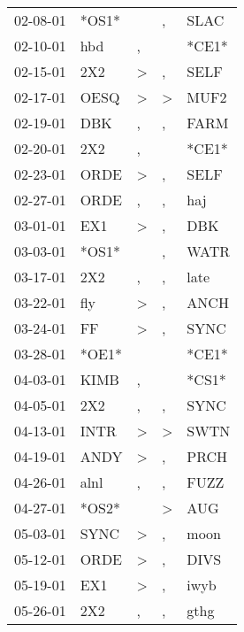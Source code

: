 \begin{supertabular}{lllll}
 02-08-01 &  *OS1* &                  &                , &   SLAC \\
 02-10-01 &    hbd &                , &                  &  *CE1* \\
 02-15-01 &    2X2 &     \textgreater &                , &   SELF \\
 02-17-01 &   OESQ &     \textgreater &     \textgreater &   MUF2 \\
 02-19-01 &    DBK &                , &                , &   FARM \\
 02-20-01 &    2X2 &                , &                  &  *CE1* \\
 02-23-01 &   ORDE &     \textgreater &                , &   SELF \\
 02-27-01 &   ORDE &                , &                , &    haj \\
 03-01-01 &    EX1 &     \textgreater &                , &    DBK \\
 03-03-01 &  *OS1* &                  &                , &   WATR \\
 03-17-01 &    2X2 &                , &                , &   late \\
 03-22-01 &    fly &     \textgreater &                , &   ANCH \\
 03-24-01 &     FF &     \textgreater &                , &   SYNC \\
 03-28-01 &  *OE1* &                  &                  &  *CE1* \\
 04-03-01 &   KIMB &                , &                  &  *CS1* \\
 04-05-01 &    2X2 &                , &                , &   SYNC \\
 04-13-01 &   INTR &     \textgreater &     \textgreater &   SWTN \\
 04-19-01 &   ANDY &     \textgreater &                , &   PRCH \\
 04-26-01 &   alnl &                , &                , &   FUZZ \\
 04-27-01 &  *OS2* &                  &     \textgreater &    AUG \\
 05-03-01 &   SYNC &     \textgreater &                , &   moon \\
 05-12-01 &   ORDE &     \textgreater &                , &   DIVS \\
 05-19-01 &    EX1 &     \textgreater &                , &   iwyb \\
 05-26-01 &    2X2 &                , &                , &   gthg \\

\end{supertabular}
